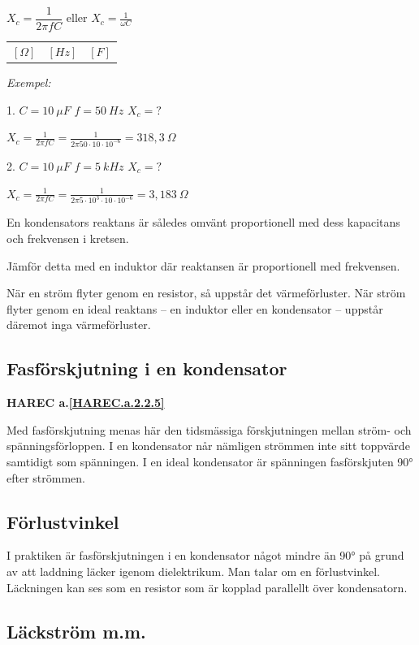 \(X_c = \dfrac{1}{2πfC}\) eller \(X_c = \frac{1}{\omega C}\)

\begin{tabular}{lll}
 \([\Omega]\) & \([Hz]\) & \([F]\) 
 \end{tabular}

\emph{Exempel:}

1. \(C = 10\ \mu F\) \(f = 50\ Hz\) \(X_c = ?\)

\(X_c = \frac{1}{2πfC} = \frac{1}{2π 50 \cdot 10 \cdot 10^{-6}} = 318,3\ Ω\)

2. \(C = 10\ \mu F\) \(f = 5\ kHz\) \(X_c = ?\)

\(X_c = \frac{1}{2πfC} = \frac{1}{2π 5 \cdot 10^3 \cdot 10 \cdot 10^{-6}}
= 3,183\ Ω\)

En kondensators reaktans är således omvänt proportionell med dess kapacitans
och frekvensen i kretsen.

Jämför detta med en induktor där reaktansen är proportionell med frekvensen.

När en ström flyter genom en resistor, så uppstår det värmeförluster. När ström
flyter genom en ideal reaktans -- en induktor eller en kondensator -- uppstår
däremot inga värmeförluster.

\subsection{Fasförskjutning i en kondensator}
\textbf{HAREC a.\ref{HAREC.a.2.2.5}\label{myHAREC.a.2.2.5}}

Med fasförskjutning menas här den tidsmässiga förskjutningen mellan ström- och
spänningsförloppen. I en kondensator når nämligen strömmen inte sitt toppvärde
samtidigt som spänningen. I en ideal kondensator är spänningen fasförskjuten 90°
efter strömmen.

\subsection{Förlustvinkel}

I praktiken är fasförskjutningen i en kondensator något mindre än 90° på grund
av att laddning läcker igenom dielektrikum. Man talar om en förlustvinkel.
Läckningen kan ses som en resistor som är kopplad parallellt över kondensatorn.

\subsection{Läckström m.m.}


